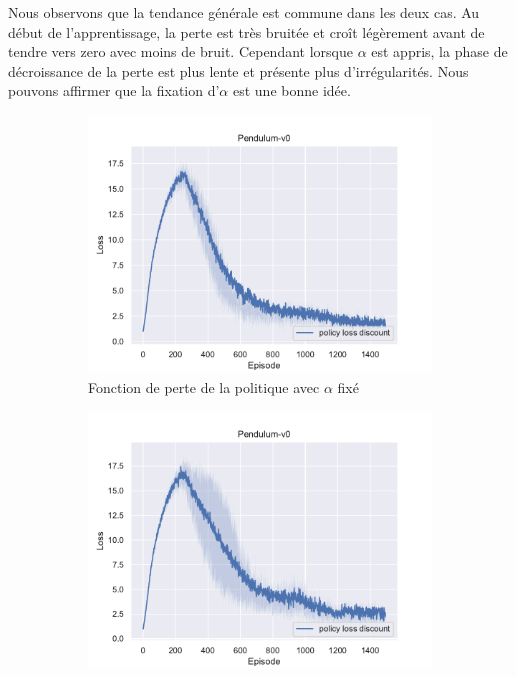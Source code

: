 Nous observons que la tendance générale est commune dans les deux cas. Au début
de l'apprentissage, la perte est très bruitée et croît légèrement avant de
tendre vers zero avec moins de bruit. Cependant lorsque \(\alpha\) est appris,
la phase de décroissance de la perte est plus lente et présente plus
d'irrégularités. Nous pouvons affirmer que la fixation d'\(\alpha\) est une
bonne idée.

\begin{figure}[H]
    \centering
    \begin{subfigure}{0.45\textwidth}
        \includegraphics[width=\textwidth]{figures/sac_itr4/a_fixed/policy_loss_Pendulum-v0_pg_dataset_td_trajs_1500_update_threshold_1000_nb_updates_20_gamma_0.98_tau_0.01_nstep_5_lr_act_0.0005_lr_critic_0.001_init_alpha_0.02_lr_alpha_0.0_target_entropy_alpha_-1.0pg.pdf}
        \caption{Fonction de perte de la politique avec \(\alpha\) fixé}
    \end{subfigure}
    \begin{subfigure}{0.45\textwidth}
        \includegraphics[width=\textwidth]{figures/sac_itr4/a_learned/policy_loss_Pendulum-v0_pg_dataset_td_trajs_1500_update_threshold_1000_nb_updates_20_gamma_0.98_tau_0.01_nstep_5_lr_act_0.0005_lr_critic_0.001_init_alpha_0.02_lr_alpha_0.001_target_entropy_alpha_-1.0pg.pdf}

\end{subfigure}
\end{figure}
